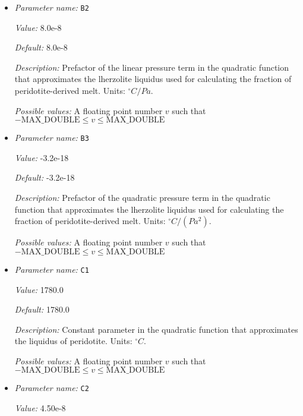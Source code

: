\begin{itemize}
{\it Possible values:} A floating point number $v$ such that $-\text{MAX\_DOUBLE} \leq v \leq \text{MAX\_DOUBLE}$
\item {\it Parameter name:} {\tt B2}
\label{parameters:Material model/Melt simple/B2}


{\it Value:} 8.0e-8


{\it Default:} 8.0e-8


{\it Description:} Prefactor of the linear pressure term in the quadratic function that approximates the  lherzolite liquidus used for calculating the fraction of peridotite-derived melt. Units: ${}^\circ C/Pa$.


{\it Possible values:} A floating point number $v$ such that $-\text{MAX\_DOUBLE} \leq v \leq \text{MAX\_DOUBLE}$
\item {\it Parameter name:} {\tt B3}
\label{parameters:Material model/Melt simple/B3}


{\it Value:} -3.2e-18


{\it Default:} -3.2e-18


{\it Description:} Prefactor of the quadratic pressure term in the quadratic function that approximates the  lherzolite liquidus used for calculating the fraction of peridotite-derived melt. Units: ${}^\circ C/(Pa^2)$.


{\it Possible values:} A floating point number $v$ such that $-\text{MAX\_DOUBLE} \leq v \leq \text{MAX\_DOUBLE}$
\item {\it Parameter name:} {\tt C1}
\label{parameters:Material model/Melt simple/C1}


{\it Value:} 1780.0


{\it Default:} 1780.0


{\it Description:} Constant parameter in the quadratic function that approximates the liquidus of peridotite. Units: ${}^\circ C$.


{\it Possible values:} A floating point number $v$ such that $-\text{MAX\_DOUBLE} \leq v \leq \text{MAX\_DOUBLE}$
\item {\it Parameter name:} {\tt C2}
\label{parameters:Material model/Melt simple/C2}


{\it Value:} 4.50e-8



\end{itemize}

